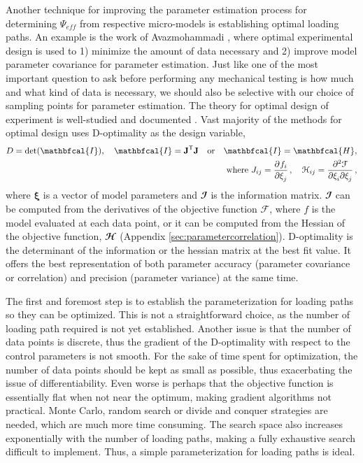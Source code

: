 	Another technique for improving the parameter estimation process for determining $\Psi_{eff}$ from respective micro-models is establishing optimal loading paths. An example is the work of Avazmohammadi \cite{avazmohammadi_novel_2017}, where optimal experimental design is used to 1) minimize the amount of data necessary and 2) improve model parameter covariance for parameter estimation. Just like one of the most important question to ask before performing any mechanical testing is how much and what kind of data is necessary, we should also be selective with our choice of sampling points for parameter estimation. The theory for optimal design of experiment is well-studied and documented \cite{lanir_optimal_1996, zhu_d_2014}. Vast majority of the methods for optimal design uses D-optimality as the design variable,
\begin{equation}\label{eqn:doptimality}
\begin{aligned}
D = \det(\mathbfcal{I}), \quad \mathbfcal{I} = \mathbf{J}^\mathsf{T}\mathbf{J} \quad \mathrm{or} \quad \mathbfcal{I} = \mathbfcal{H},	\\
\mathrm{where} \ J_{ij} = \dpd{f_i}{\xi_j}, \quad \mathcal{H}_{ij} = \dmd{\mathcal{F}}{2}{\xi_i}{}{\xi_j}{},
\end{aligned}
\end{equation}
    where $\mathbf{\xi}$ is a vector of model parameters and $\mathbfcal{I}$ is the information matrix. $\mathbfcal{I}$ can be computed from the derivatives of the objective function $\mathcal{F}$, where $f$ is the model evaluated at each data point, or it can be computed from the Hessian of the objective function, $\mathbfcal{H}$ (Appendix \ref{sec:parametercorrelation}). D-optimality is the determinant of the information or the hessian matrix at the best fit value. It offers the best representation of both parameter accuracy (parameter covariance or correlation) and precision (parameter variance) at the same time.

    
    The first and foremost step is to establish the parameterization for loading paths so they can be optimized. This is not a straightforward choice, as the number of loading path required is not yet established. Another issue is that the number of data points is discrete, thus the gradient of the D-optimality with respect to the control parameters is not smooth. For the sake of time spent for optimization, the number of data points should be kept as small as possible, thus exacerbating the issue of differentiability. Even worse is perhaps that the objective function is essentially flat when not near the optimum, making gradient algorithms not practical. Monte Carlo, random search or divide and conquer strategies are needed, which are much more time consuming. The search space also increases exponentially with the number of loading paths, making a fully exhaustive search difficult to implement. Thus, a simple parameterization for loading paths is ideal. 
    

